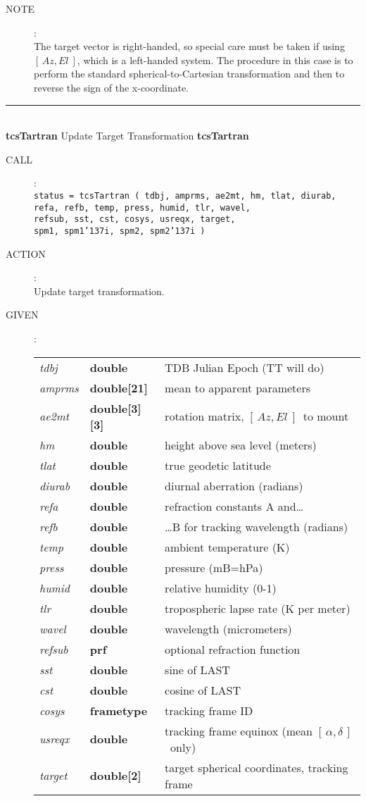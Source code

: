 \documentclass[12pt,fleqn,twoside]{article}
\renewcommand{\_}{{\tt\char'137}}     %
\newcommand{\radec}     {$[\,\alpha,\delta\,]$}
\newcommand{\azel}      {$[\,Az,El~]$}
\newcommand{\routine}[2]
{
  \newpage
  \rule{\textwidth}{0.3mm}\\ \nopagebreak
  {\Large {\bf #1} \hfill #2 \hfill {\bf #1}}
  \vspace{-1ex}
}
\newcommand{\call}[1]
{
  \goodbreak
  \begin{description}
    \item[CALL]: \\[0.5ex] \nopagebreak
        {\tt #1}
  \end{description}
  \vspace{-3ex}
}
\newcommand{\action}[1]
{
  \goodbreak
  \begin{description}
    \item[ACTION]: \\[0.5ex] \nopagebreak
        #1
  \end{description}
  \vspace{-3ex}
}
\newcommand{\args}[2]
{
  \goodbreak
  \begin{description}
  \item[#1]: \\[1.5ex] \nopagebreak
    \hspace*{-0.9em}
    \begin{tabular}{p{4.5em}p{5.8em}p{23.5em}}
      #2
    \end{tabular}
  \end{description}
  \vspace{-3ex}
}
\newcommand{\spec}[3]
{
  {\em {#1}} & {\bf \mbox{#2}} & {#3}
}
\newcommand{\anote}[1]
{
  \goodbreak
  \begin{description}
    \item[NOTE]: \\[0.5ex] \nopagebreak
        #1
  \end{description}
  \vspace{-3ex}
}
\begin{document}
\anote{The target vector is right-handed, so special care must be
       taken if using \azel, which is a left-handed system.  The
       procedure in this case is to perform the standard
       spherical-to-Cartesian transformation and then to reverse the
       sign of the {x}-coordinate.}
\routine{tcsTartran}{Update Target Transformation}
\label{tcsTartran}
\call{status = tcsTartran ( tdbj, amprms, ae2mt, hm, tlat, diurab, \\
           \hspace*{10.5em} refa, refb, temp, press, humid, tlr, wavel, \\
           \hspace*{10.5em} refsub, sst, cst, cosys, usreqx, target, \\
           \hspace*{10.5em} spm1, spm1\_i,
                            spm2, spm2\_i ) }
\action{Update target transformation.}
\args{GIVEN}
{
\spec{tdbj}{double}{TDB Julian Epoch (TT will do)} \\
\spec{amprms}{double[21]}{mean to apparent parameters} \\
\spec{ae2mt}{double[3][3]}{rotation matrix, \azel\ to mount} \\
\spec{hm}{double}{height above sea level (meters)} \\
\spec{tlat}{double}{true geodetic latitude} \\
\spec{diurab}{double}{diurnal aberration (radians)} \\
\spec{refa}{double}{refraction constants A and\ldots} \\
\spec{refb}{double}{\ldots B for tracking wavelength (radians)} \\
\spec{temp}{double}{ambient temperature (K)} \\
\spec{press}{double}{pressure (mB=hPa)} \\
\spec{humid}{double}{relative humidity (0-1)} \\
\spec{tlr}{double}{tropospheric lapse rate (K per meter)} \\
\spec{wavel}{double}{wavelength (micrometers)} \\
\spec{refsub}{{\sc prf}}{optional refraction function} \\
\spec{sst}{double}{sine of LAST} \\
\spec{cst}{double}{cosine of LAST} \\
\spec{cosys}{{\sc frametype}}{tracking frame ID} \\
\spec{usreqx}{double}{tracking frame equinox (mean \radec\ only) } \\
\spec{target}{double[2]}{target spherical coordinates, tracking frame }
}
\end{document}
